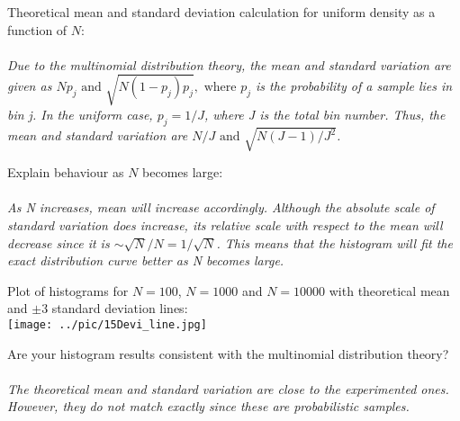 \documentclass[12pt]{article}
\begin{document}
\begin{enumerate}
\vspace{3in}


Theoretical  mean and standard deviation calculation for uniform density as a function of $N$:
\\\\
{\em
Due to the multinomial distribution theory, the mean and standard variation are given as
\begin{math}
Np_j \text{ and } \sqrt{N(1-p_j)p_j}, 
\text{ where }  p_j \end{math} is the probability of a sample lies in bin j.
In the uniform case, \begin{math} p_j = 1/J \end{math}, where J is the total bin number.
Thus, the mean and standard variation are \begin{math} N/J \text{ and } \sqrt{N(J-1)/J^2} \end{math}.
}
\vspace{1in}


Explain behaviour as $N$ becomes large:
\\\\
{\em
As N increases, mean will increase accordingly. Although the absolute scale of standard variation does increase, its relative scale with respect to the mean will decrease since it is \begin{math}\sim \sqrt{N}/N = 1/\sqrt{N}\end{math}. This means that the histogram will fit the exact distribution curve better as N becomes large.
}
\vspace{2cm}



Plot of histograms for $N=100$,  $N=1000$ and $N=10000$ with theoretical mean  and $\pm 3$ standard deviation lines:
\\
\texttt{[image: ../pic/15Devi\_line.jpg]}

\vspace{3in}


 Are your histogram results consistent with the multinomial distribution theory? 
\\\\
{\em
The theoretical mean and standard variation are close to the experimented ones. However, they do not match exactly since these are probabilistic samples.
}
\vspace{2cm}



\end{enumerate}
\end{document}
